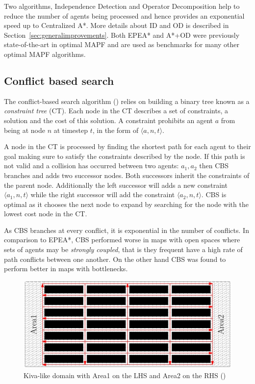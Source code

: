 \documentclass[a4paper,11pt]{article}
\begin{document}
Two algorithms, Independence Detection and Operator Decomposition help to reduce the number of agents being processed and hence provides an exponential speed up to Centralized A*. More details about ID and OD is described in Section~\ref{sec:generalimprovements}. Both EPEA* and A*+OD were previously state-of-the-art in optimal MAPF and are used as benchmarks for many other optimal MAPF algorithms.

\subsection{Conflict based search} \label{sec:cbs}
The conflict-based search algorithm (\cite{sharon2015conflict}) relies on building a binary tree known as a  \textit{constraint tree} (CT). Each node in the CT describes a set of constraints, a solution and the cost of this solution. A constraint prohibits an agent $a$ from being at node $n$ at timestep $t$, in the form of $\langle a, n, t \rangle$.

A node in the CT is processed by finding the shortest path for each agent to their goal making sure to satisfy the constraints described by the node. If this path is not valid and a collision has occurred between two agents: $a_1, a_2$ then CBS branches and adds two successor nodes. Both successors inherit the constraints of the parent node. Additionally the left successor will adds a new constraint $\langle a_1, n, t \rangle$ while the right successor will add the constraint $\langle a_2, n, t \rangle$. CBS is optimal as it chooses the next node to expand by searching for the node with the lowest cost node in the CT.

As CBS branches at every conflict, it is exponential in the number of conflicts. In comparison to EPEA*, CBS performed worse in maps with open spaces where sets of agents may be \textit{strongly coupled}, that is they frequent have a high rate of path conflicts between one another. On the other hand CBS was found to perform better in maps with bottlenecks.

\begin{figure}[!htb]
	\centering
	\centering
	\includegraphics[width=0.9\linewidth]{graphics/ecbskivadomain}
	\caption{Kiva-like domain with Area1 on the LHS and Area2 on the RHS (\cite{cohen2016improved})}
	\label{fig:cbskivadomain}
\end{figure}
\end{document}

